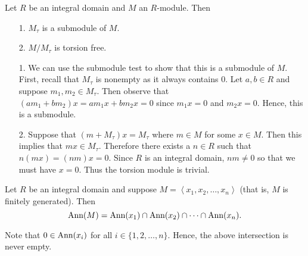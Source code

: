\begin{proposition}
    Let $R$ be an integral domain and $M$ an $R$-module. Then 
    \begin{itemize}
        \item[1.] $M_\tau$ is a submodule of $M$. 
        \item[2.] $M/M_\tau$ is torsion free. 
    \end{itemize}
\end{proposition}

\begin{prf}
    \begin{itemize}
        \item[1.] We can use the submodule test to show that this
        is a submodule of $M$. First, recall that $M_\tau$ is
        nonempty as it always contains 0. Let $a, b \in R$ and suppose $m_1,
        m_2 \in M_\tau$. Then observe that $(am_1 + bm_2)x = am_1x
        + bm_2x = 0$ since $m_1x = 0$ and $m_2x = 0$. Hence, this
        is a submodule.

        \item[2.] Suppose that $(m + M_\tau)x = M_\tau$ where $m
        \in M$ for some $x \in M$. 
        Then this implies that $mx \in M_\tau$. Therefore there
        exists a $n \in R$ such that $n(mx) = (nm)x = 0$. Since
        $R$ is an integral domain, $nm \ne 0$ so that we must have
        $x = 0$. Thus the torsion module is trivial.
    \end{itemize}
\end{prf}

\begin{proposition}
    Let $R$ be an integral domain and suppose $M = \left< x_1,x_2,
    \dots, x_n \right>$ (that is, $M$ is finitely generated). Then 
    \[
        \mbox{Ann}(M) = \mbox{Ann}(x_1) \cap \mbox{Ann}(x_2) \cap \dots \cap \mbox{Ann}(x_n).
    \] 
\end{proposition}
Note that $0 \in \mbox{Ann}(x_i)$ for all $i \in \{1, 2, \dots, n\}$.
Hence, the above intersection is never empty. 

